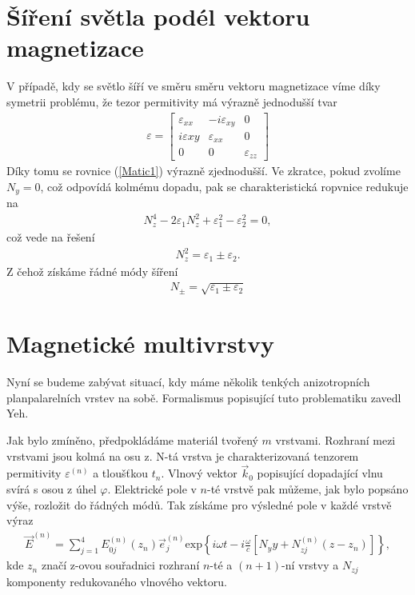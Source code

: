 \section{Šíření světla podél vektoru magnetizace}
V případě, kdy se světlo šíří ve směru směru vektoru magnetizace víme díky symetrii problému, že tezor permitivity má výrazně jednodušší tvar
\begin{eqnarray}
\varepsilon=\begin{bmatrix}\varepsilon_{xx}&  -i\varepsilon_{xy}& 0 \\ i\varepsilon{xy}& \varepsilon_{xx}&  0 \\ 0&0& \varepsilon_{zz}\end{bmatrix}
\label{epsilon polar}
\end{eqnarray}
Díky tomu se rovnice (\ref{Matic1}) výrazně zjednodušší. Ve zkratce, pokud zvolíme $N_y=0$, což odpovídá kolmému dopadu, pak se charakteristická ropvnice redukuje na
\begin{eqnarray}
N_z^4-2\varepsilon_1N_z^2+\varepsilon_1^2-\varepsilon_2^2=0,
\end{eqnarray}
což vede na řešení
\begin{eqnarray}
N_z^2=\varepsilon_1 \pm \varepsilon_2.
\end{eqnarray}
Z čehož získáme řádné módy šíření
\begin{eqnarray}
N_\pm=\sqrt{\varepsilon_1\pm\varepsilon_2}
\end{eqnarray}


\section{Magnetické multivrstvy}
Nyní se budeme zabývat situací, kdy máme několik tenkých anizotropních planpalarelních vrstev na sobě. Formalismus popisující tuto problematiku zavedl Yeh. %

Jak bylo zmíněno, předpokládáme materiál tvořený $m$ vrstvami. Rozhraní mezi vrstvami jsou kolmá na osu z. N-tá vrstva je charakterizovaná tenzorem permitivity $\varepsilon^{(n)}$ a tloušťkou $t_n$. Vlnový vektor $\vec{k}_0$ popisující dopadající vlnu svírá s osou z úhel $\varphi$. Elektrické pole v $n$-té vrstvě pak můžeme, jak bylo popsáno výše, rozložit do řádných módů. Tak získáme pro výsledné pole v každé vrstvě výraz
\begin{eqnarray}
\vec{E}^{(n)}=\sum^4_{j=1}E_{0j}^{(n)}(z_n)\vec{e}_j^{(n)}\mbox{exp}\left\{i\omega t-i\frac{\omega}{c}[N_yy+N_{zj}^{(n)}(z-z_n)]\right\},
\end{eqnarray}
kde $z_n$ značí z-ovou souřadnici rozhraní $n$-té a $(n+1)$-ní vrstvy a $N_{zj}$ komponenty redukovaného vlnového vektoru.

